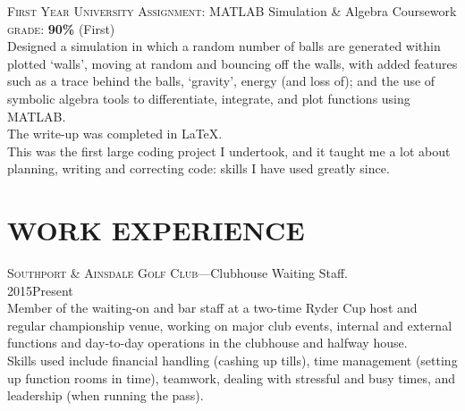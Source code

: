 \documentclass[9pt,a4paper]{article}
\begin{document}
{\noindent\textsc{First Year University Assignment:} MATLAB Simulation \& Algebra Coursework\\
\hangindent=0.7cm \textsc{grade: }\textbf{90\%} (First)\\
Designed a simulation in which a random number of balls are generated within plotted `walls', moving at random and bouncing off the walls, with added features such as a trace behind the balls, `gravity', energy (and loss of); and the use of symbolic algebra tools to differentiate, integrate, and plot functions using MATLAB.\\ The write-up was completed in \LaTeX.\\ This was the first large coding project I undertook, and it taught me a lot about planning, writing and correcting code: skills I have used greatly since. \vspace{3mm}


\section{WORK EXPERIENCE}
\noindent\textsc{Southport \& Ainsdale Golf Club}---Clubhouse Waiting Staff.\\
\hangindent=0.7cm 2015\textemdash Present\\
Member of the waiting-on and bar staff at a two-time Ryder Cup host and regular championship venue, working on major club events, internal and external functions and day-to-day operations in the clubhouse and halfway house.\\
Skills used include financial handling (cashing up tills), time management (setting up function rooms in time), teamwork, dealing with stressful and busy times, and leadership (when running the pass). 



}
\end{document}
